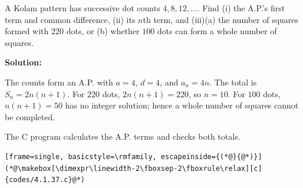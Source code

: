 \documentclass[journal]{IEEEtran}
\begin{document}
\vspace{0.8em}
\begin{list}{}{\setlength{\leftmargin}{1.15cm}\setlength{\labelwidth}{1.0cm}\setlength{\labelsep}{0.15cm}\setlength{\itemindent}{0pt}\setlength{\listparindent}{0pt}\setlength{\parsep}{0pt}\setlength{\topsep}{0pt}}
\item[4.1.37] A Kolam pattern has successive dot counts $4,8,12,\ldots$. Find (i) the A.P.'s first term and common difference, (ii) its $n$th term, and (iii)(a) the number of squares formed with $220$ dots, or (b) whether $100$ dots can form a whole number of squares.

\vspace{0.7em}\par\noindent\textbf{Solution:}

The counts form an A.P. with $a=4$, $d=4$, and $a_n=4n$. The total is $S_n=2n(n+1)$. For $220$ dots, $2n(n+1)=220$, so $n=10$. For $100$ dots, $n(n+1)=50$ has no integer solution; hence a whole number of squares cannot be completed.

The C program calculates the A.P. terms and checks both totals.
\begin{lstlisting}[frame=single, basicstyle=\rmfamily, escapeinside={(*@}{@*)}]
(*@\makebox[\dimexpr\linewidth-2\fboxsep-2\fboxrule\relax][c]{codes/4.1.37.c}@*)
\end{lstlisting}
\end{list}
\end{document}
